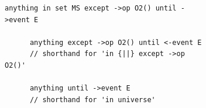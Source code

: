 \begin{figure}[H]
  \begin{subfigure}[c]{\egtextwidth}
    \begin{lstlisting}[style=Example]
      anything in set MS except ->op O2() until ->event E

      anything except ->op O2() until <-event E
      // shorthand for 'in {||} except ->op O2()'

      anything until ->event E
      // shorthand for 'in universe'
    \end{lstlisting}
  \end{subfigure}
  \hfill
  \begin{subfigure}[c]{\eggraphicalwidth}
    \gsecaption
    \centering
  \end{subfigure}
\end{figure}
